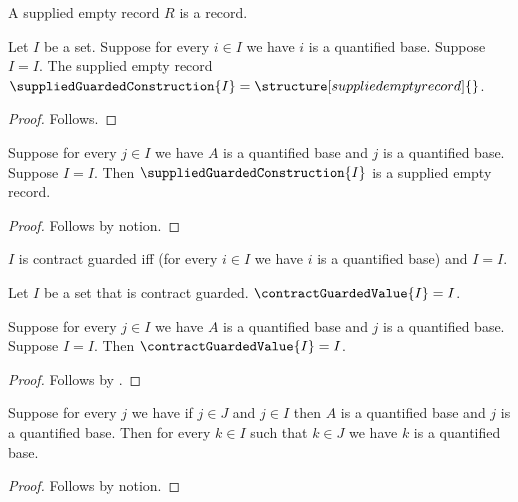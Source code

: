

\begin{struct}\label{supplied_empty_record}
    A supplied empty record $R$ is a record.
\end{struct}

\begin{construction}\label{supplied_guarded_construction}
    Let $I$ be a set.
    Suppose for every $i\in I$ we have $i$ is a quantified base.
    Suppose $I=I$.
    The supplied empty record $\suppliedGuardedConstruction{I}=\structure[supplied empty record]{}$.
\end{construction}
\begin{proof}
    Follows.
\end{proof}

\begin{proposition}\label{supplied_construction_consumer}
    Suppose for every $j\in I$ we have $A$ is a quantified base and $j$ is a quantified base.
    Suppose $I=I$.
    Then $\suppliedGuardedConstruction{I}$ is a supplied empty record.
\end{proposition}
\begin{proof}
    Follows by notion.
\end{proof}

\begin{abbreviation}\label{contract_guarded}
    $I$ is contract guarded iff
        (for every $i\in I$ we have $i$ is a quantified base) and $I=I$.
\end{abbreviation}

\begin{definition}\label{contract_guarded_value}
    Let $I$ be a set that is contract guarded.
    $\contractGuardedValue{I}=I$.
\end{definition}

\begin{proposition}\label{guarded_contract_consumer}
    Suppose for every $j\in I$ we have $A$ is a quantified base and $j$ is a quantified base.
    Suppose $I=I$.
    Then $\contractGuardedValue{I}=I$.
\end{proposition}
\begin{proof}
    Follows by .
\end{proof}

\begin{proposition}\label{supplied_root_goal}
    Suppose for every $j$ we have if $j\in J$ and $j\in I$ then $A$ is a quantified base and $j$ is a quantified base.
    Then for every $k\in I$ such that $k\in J$ we have $k$ is a quantified base.
\end{proposition}
\begin{proof}
    Follows by notion.
\end{proof}

